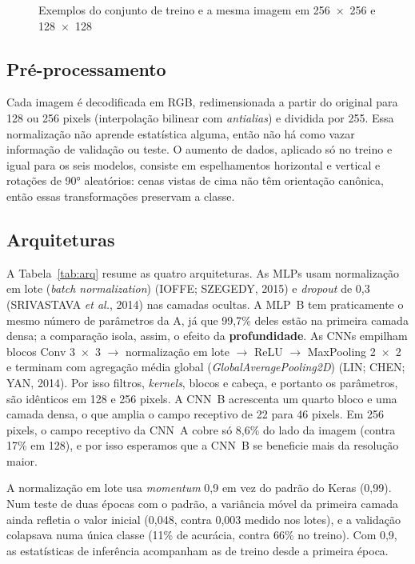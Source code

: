 \documentclass[12pt,a4paper]{article}
\newcommand{\fonte}[1]{\par\vspace{2pt}{\footnotesize Fonte: #1\par}}
\newcommand{\fonteautores}{\fonte{elaborado pelos autores a partir do NWPU-RESISC45 (CHENG; HAN; LU, 2017).}}
\begin{document}
\begin{figure}[H]
\centering
\caption{Exemplos do conjunto de treino e a mesma imagem em 256~×~256 e 128~×~128}\label{fig:exemplos}
\hfill
{}
\fonteautores
\end{figure}

\subsection{Pré-processamento}

Cada imagem é decodificada em RGB, redimensionada a partir do original para 128 ou 256 pixels (interpolação bilinear com \textit{antialias}) e dividida por 255. Essa normalização não aprende estatística alguma, então não há como vazar informação de validação ou teste. O aumento de dados, aplicado só no treino e igual para os seis modelos, consiste em espelhamentos horizontal e vertical e rotações de 90° aleatórios: cenas vistas de cima não têm orientação canônica, então essas transformações preservam a classe.

\subsection{Arquiteturas}

A Tabela~\ref{tab:arq} resume as quatro arquiteturas. As MLPs usam normalização em lote (\textit{batch normalization}) (IOFFE; SZEGEDY, 2015) e \textit{dropout} de 0,3 (SRIVASTAVA \textit{et al.}, 2014) nas camadas ocultas. A MLP~B tem praticamente o mesmo número de parâmetros da A, já que 99,7\% deles estão na primeira camada densa; a comparação isola, assim, o efeito da \textbf{profundidade}. As CNNs empilham blocos Conv 3~×~3 \(\rightarrow\) normalização em lote \(\rightarrow\) ReLU \(\rightarrow\) MaxPooling 2~×~2 e terminam com agregação média global (\textit{GlobalAveragePooling2D}) (LIN; CHEN; YAN, 2014). Por isso filtros, \textit{kernels}, blocos e cabeça, e portanto os parâmetros, são idênticos em 128 e 256 pixels. A CNN~B acrescenta um quarto bloco e uma camada densa, o que amplia o campo receptivo de 22 para 46 pixels. Em 256 pixels, o campo receptivo da CNN~A cobre só 8,6\% do lado da imagem (contra 17\% em 128), e por isso esperamos que a CNN~B se beneficie mais da resolução maior.

A normalização em lote usa \textit{momentum} 0,9 em vez do padrão do Keras (0,99). Num teste de duas épocas com o padrão, a variância móvel da primeira camada ainda refletia o valor inicial (0,048, contra 0,003 medido nos lotes), e a validação colapsava numa única classe (11\% de acurácia, contra 66\% no treino). Com 0,9, as estatísticas de inferência acompanham as de treino desde a primeira época.
\end{document}
